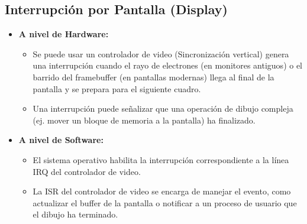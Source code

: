 \documentclass{article}
\begin{document}
{{\subsection{Interrupción por Pantalla (Display)}
\begin{itemize}
    \item \textbf{A nivel de Hardware:}
    \begin{itemize}
        \item Se puede usar un controlador de video (Sincronización vertical) genera una interrupción cuando el rayo de electrones (en monitores antiguos) o el barrido del framebuffer (en pantallas modernas) llega al final de la pantalla y se prepara para el siguiente cuadro.
        \item Una interrupción puede señalizar que una operación de dibujo compleja (ej. mover un bloque de memoria a la pantalla) ha finalizado.
    \end{itemize}
    \item \textbf{A nivel de Software:}
    \begin{itemize}
        \item El sistema operativo habilita la interrupción correspondiente a la línea IRQ del controlador de video.
        \item La ISR del controlador de video se encarga de manejar el evento, como actualizar el buffer de la pantalla o notificar a un proceso de usuario que el dibujo ha terminado.
    \end{itemize}
\end{itemize}


}}
\end{document}
